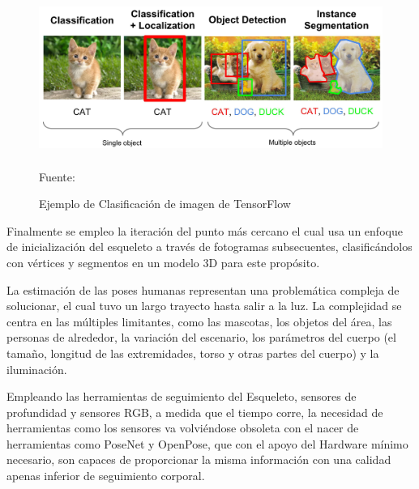 \begin{figure}[t!]
	\centering
	\includegraphics[width=13cm,height=5cm,]{./Images/ejemplotensorflow.jpg}
	\caption{Ejemplo de Clasificación de imagen de TensorFlow}
	\footnotesize Fuente: \cite{ejemplotensorflow}
	\label{tensorfl}
\end{figure}

Finalmente se empleo la iteración del punto más cercano \cite{grest2005nonlinear} el cual usa un enfoque de inicialización del esqueleto a través de fotogramas subsecuentes, clasificándolos con vértices y segmentos en un modelo 3D para este propósito.

La estimación de las poses humanas representan una problemática compleja de solucionar, el cual tuvo un largo trayecto hasta salir a la luz. La complejidad se centra en las múltiples limitantes, como las mascotas, los objetos del área, las personas de alrededor, la variación del escenario, los parámetros del cuerpo (el tamaño, longitud de las extremidades, torso y otras partes del cuerpo) y la iluminación.

Empleando las herramientas de seguimiento del Esqueleto, sensores de profundidad y sensores RGB, a medida que el tiempo corre, la necesidad de herramientas como los sensores va volviéndose obsoleta con el nacer de herramientas como PoseNet y OpenPose, que con el apoyo del Hardware mínimo necesario, son capaces de proporcionar la misma información con una calidad apenas inferior de seguimiento corporal.

